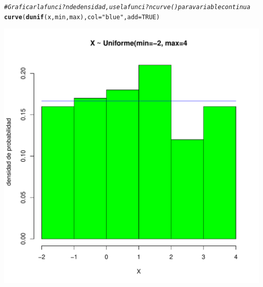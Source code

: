 \documentclass[10pt,a4paper]{article}\usepackage[]{graphicx}\usepackage[]{color}
\makeatletter
\def\maxwidth{ %
  \ifdim\Gin@nat@width>\linewidth
    \linewidth
  \else
    \Gin@nat@width
  \fi
}
\newcommand{\hlnum}[1]{\textcolor[rgb]{0.686,0.059,0.569}{#1}}%
\newcommand{\hlstr}[1]{\textcolor[rgb]{0.192,0.494,0.8}{#1}}%
\newcommand{\hlcom}[1]{\textcolor[rgb]{0.678,0.584,0.686}{\textit{#1}}}%
\newcommand{\hlstd}[1]{\textcolor[rgb]{0.345,0.345,0.345}{#1}}%
\newcommand{\hlkwc}[1]{\textcolor[rgb]{0.333,0.667,0.333}{#1}}%
\newcommand{\hlkwd}[1]{\textcolor[rgb]{0.737,0.353,0.396}{\textbf{#1}}}%
\newenvironment{kframe}{%
 \def\at@end@of@kframe{}%
 \ifinner\ifhmode%
  \def\at@end@of@kframe{\end{minipage}}%
  \begin{minipage}{\columnwidth}%
 \fi\fi%
 \def\FrameCommand##1{\hskip\@totalleftmargin \hskip-\fboxsep
 \colorbox{shadecolor}{##1}\hskip-\fboxsep
     \hskip-\linewidth \hskip-\@totalleftmargin \hskip\columnwidth}%
 \MakeFramed {\advance\hsize-\width
   \@totalleftmargin\z@ \linewidth\hsize
   \@setminipage}}%
 {\par\unskip\endMakeFramed%
 \at@end@of@kframe}
\newenvironment{knitrout}{}{} %
\makeatother
\begin{document}
\begin{knitrout}
\begin{kframe}
\begin{alltt}
\hlcom{#Graficar la funci?n de densidad, use la funci?n curve() para variable continua }
\hlkwd{curve}\hlstd{(}\hlkwd{dunif}\hlstd{(x, min, max),} \hlkwc{col}\hlstd{=}\hlstr{"blue"}\hlstd{,} \hlkwc{add}\hlstd{=}\hlnum{TRUE}\hlstd{)}
\end{alltt}
\end{kframe}
\includegraphics[width=\maxwidth]{figure/unnamed-chunk-4-1} 

\end{knitrout}
\end{document}

